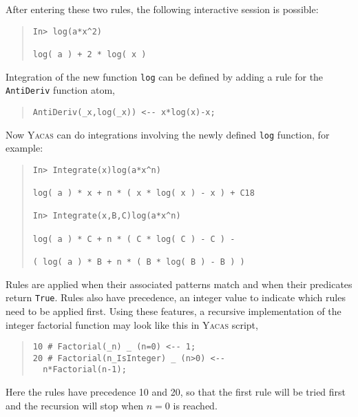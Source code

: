 \documentclass{llncs}
\begin{document}
After entering these two rules, the following interactive session is possible:

\begin{quote}\small\begin{verbatim}
In> log(a*x^2)

log( a ) + 2 * log( x )
\end{verbatim}\end{quote}

Integration of the new function \small{\texttt{log}} can be defined by adding a rule for the
\small{\texttt{AntiDeriv}} function atom,

\begin{quote}\small\begin{verbatim}
AntiDeriv(_x,log(_x)) <-- x*log(x)-x;
\end{verbatim}\end{quote}
Now \textsc{Yacas} can do integrations involving the newly defined \small{\texttt{log}} function, for example:

\begin{quote}\small\begin{verbatim}
In> Integrate(x)log(a*x^n)

log( a ) * x + n * ( x * log( x ) - x ) + C18

In> Integrate(x,B,C)log(a*x^n)

log( a ) * C + n * ( C * log( C ) - C ) -

( log( a ) * B + n * ( B * log( B ) - B ) )
\end{verbatim}\end{quote}

Rules are applied when their associated patterns match and when their
predicates return \small{\texttt{True}}. Rules also have precedence, an integer value
to indicate which rules need to be applied first. Using these features, a
recursive implementation of the integer factorial function may look like this
in \textsc{Yacas} script,

\begin{quote}\small\begin{verbatim}
10 # Factorial(_n) _ (n=0) <-- 1;
20 # Factorial(n_IsInteger) _ (n>0) <--
  n*Factorial(n-1);
\end{verbatim}\end{quote}
Here the rules have precedence 10 and 20, so that the first rule will be tried first and the recursion will stop when $n = 0$ is reached.
\end{document}
